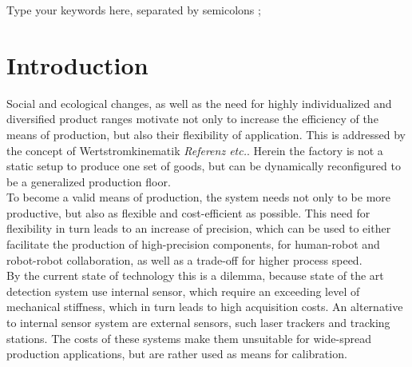 \documentclass[5p,times,procedia]{elsarticle}
\begin{document}
\begin{frontmatter}
	\begin{keyword}
		Type your keywords here, separated by semicolons ;
		
		
		
		
	\end{keyword}
	
\end{frontmatter}



\section{Introduction}
%
%
%
%
%
%
%
Social and ecological changes, as well as the need for
highly individualized and diversified product ranges
motivate not only to increase the efficiency of the means
of production, but also their flexibility of application.
This is addressed by the concept of Wertstromkinematik \textit{Referenz etc.}.
Herein the factory is not a static setup to produce
one set of goods, but can be dynamically reconfigured to be a generalized production floor.\\
To become a valid means of production, the system needs not only to
be more productive, but also as flexible and cost-efficient as possible. This need for flexibility in turn leads to an increase of precision, which can be used to either facilitate the production of high-precision components, for human-robot and robot-robot collaboration, as well as a trade-off for higher process speed.\\
By the current state of technology this is a dilemma, because state of the art detection system use internal sensor, which require an exceeding level of mechanical stiffness, which in turn leads to high
acquisition costs. An alternative to internal sensor system are external sensors, such laser trackers and tracking stations. The costs of these systems make them unsuitable for wide-spread production applications, but are rather used as means for calibration.\\
\end{document}
